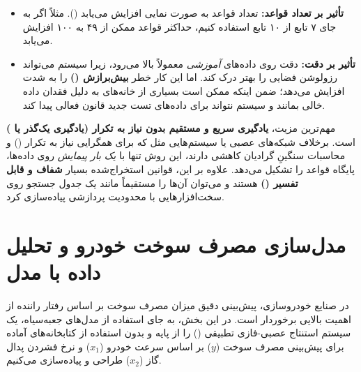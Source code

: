 \documentclass{article}
\begin{document}
\begin{tcolorbox}[
	colback=lightmutedmint,
	colframe=mutedmint,
	title=۲. افزایش تعداد توابع عضویت چه تأثیری بر تعداد قواعد و دقت سیستم دارد؟,
	coltitle=white,
	arc=3mm
	]
	\begin{itemize}[label=\textcolor{mutedmint}{$\bullet$}, leftmargin=*]
		\item \textbf{تأثیر بر تعداد قواعد:} تعداد قواعد به صورت نمایی افزایش می‌یابد (). مثلاً اگر به جای ۷ تابع از ۱۰ تابع استفاده کنیم، حداکثر قواعد ممکن از ۴۹ به ۱۰۰ افزایش می‌یابد.
		\item \textbf{تأثیر بر دقت:} دقت روی داده‌های \textit{آموزشی} معمولاً بالا می‌رود، زیرا سیستم می‌تواند رزولوشن فضایی را بهتر درک کند. اما این کار خطر \textbf{بیش‌برازش ()} را به شدت افزایش می‌دهد؛ ضمن اینکه ممکن است بسیاری از خانه‌های  به دلیل فقدان داده خالی بمانند و سیستم نتواند برای داده‌های تست جدید قانون فعالی پیدا کند.
	\end{itemize}
\end{tcolorbox}

\begin{tcolorbox}[
	colback=lightmutedlavender,
	colframe=mutedlavender,
	title=۳. مهم‌ترین مزیت استفاده از \lr{Lookup Table} در سیستم‌های فازی چیست؟,
	coltitle=white,
	arc=3mm
	]
	مهم‌ترین مزیت، \textbf{یادگیری سریع و مستقیم بدون نیاز به تکرار (یادگیری یک‌گذر یا )} است. برخلاف شبکه‌های عصبی یا سیستم‌هایی مثل  که برای همگرایی نیاز به تکرار () و محاسبات سنگینِ گرادیان کاهشی دارند، این روش تنها با \textit{یک بار پیمایش} روی داده‌ها، پایگاه قواعد را تشکیل می‌دهد. علاوه بر این، قوانین استخراج‌شده بسیار \textbf{شفاف و قابل تفسیر ()} هستند و می‌توان آن‌ها را مستقیماً مانند یک جدول جستجو روی سخت‌افزارهایی با محدودیت پردازشی پیاده‌سازی کرد.
\end{tcolorbox}
\section{مدل‌سازی مصرف سوخت خودرو و تحلیل داده با مدل }

در صنایع خودروسازی، پیش‌بینی دقیق میزان مصرف سوخت بر اساس رفتار راننده از اهمیت بالایی برخوردار است. در این بخش، به جای استفاده از مدل‌های جعبه‌سیاه، یک سیستم استنتاج عصبی-فازی تطبیقی () را از پایه و بدون استفاده از کتابخانه‌های آماده برای پیش‌بینی مصرف سوخت ($y$) بر اساس سرعت خودرو ($x_1$) و نرخ فشردن پدال گاز ($x_2$) طراحی و پیاده‌سازی می‌کنیم.
\end{document}
